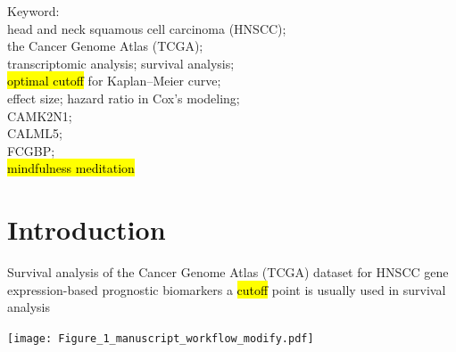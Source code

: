 \documentclass[
paper=landscape,
paper=160mm:90mm, %
fontsize=11pt, %
pagesize, %
parskip=half-, %
]{scrartcl} %
\theoremstyle{mythmstyle} %
\begin{document}
\thispagestyle{empty} %

\small\tableofcontents %


Keyword:\\
head and neck squamous cell carcinoma (HNSCC);\\
the Cancer Genome Atlas (TCGA); \\
transcriptomic analysis; survival analysis; \\
\hl{optimal cutoff} for Kaplan--Meier curve; \\
effect size; hazard ratio in Cox's modeling;\\
\acrfull{CAMK2N1}; \\
\acrfull{CALML5}; \\
\acrfull{FCGBP}; \\
\hl{mindfulness meditation}

\clearpage








\section{Introduction}




\begin{minipage}[c]{0.30\linewidth}
\begin{outline}
    \1 Survival analysis of the Cancer Genome Atlas (TCGA) dataset for HNSCC
        \2 gene expression-based prognostic biomarkers
        \2 a \hl{cutoff} point is usually used in survival analysis
\end{outline}
\end{minipage}%
\begin{minipage}[c]{0.65\linewidth}
    \raggedright
    \hfill\texttt{[image: Figure\_1\_manuscript\_workflow\_modify.pdf]}
\end{minipage}
\end{document}
